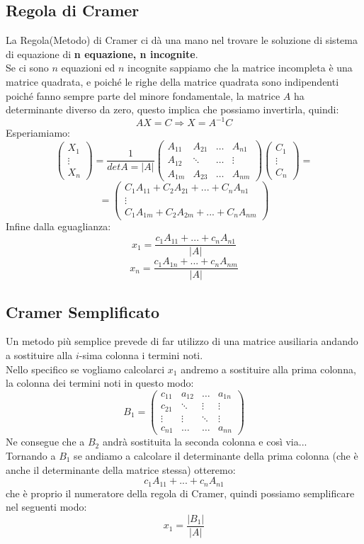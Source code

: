 \subsection{Regola di Cramer}
La Regola(Metodo) di Cramer ci dà una mano nel trovare le soluzione di sistema di equazione di \textbf{n equazione, n incognite}.\\
Se ci sono $n$ equazioni ed $n$ incognite sappiamo che la matrice
incompleta è una matrice quadrata, e poiché le righe della matrice quadrata sono indipendenti poiché fanno sempre parte del minore fondamentale, la matrice $A$ ha determinante diverso da zero, questo implica che possiamo invertirla, quindi:
$$ AX=C \Rightarrow X=A^{-1}C $$
Esperiamiamo:
$$ 
\begin{pmatrix}
X_1 \\ \vdots \\ X_n
\end{pmatrix}
= 
\frac{1}{detA = |A|}
\begin{pmatrix}
A_{11} & A_{21} & \dots & A_{n1} \\
A_{12} & \ddots & \dots & \vdots \\
A_{1m} & A_{23} & \dots & A_{nm}
\end{pmatrix}
\begin{pmatrix}
C_1 \\ \vdots \\ C_n
\end{pmatrix}
=
$$
$$ 
=
\begin{pmatrix}
C_1A_{11}+C_2A_{21}+...+C_nA_{n1} \\
\vdots \\
C_1A_{1m}+C_2A_{2m}+...+C_nA_{nm} 
\end{pmatrix}
$$
Infine dalla eguaglianza:
$$ x_1 = \frac{c_1A_{11}+...+c_nA_{n1}}{|A|} $$
$$ x_n = \frac{c_1A_{1n}+...+c_nA_{nm}}{|A|} $$

\subsection{Cramer Semplificato}
Un metodo più semplice prevede di far utilizzo di una matrice ausiliaria andando a sostituire alla $i$-sima colonna i termini noti.\\
Nello specifico se vogliamo calcolarci $x_1$ andremo a sostituire alla prima colonna, la colonna dei termini noti in questo modo:
$$
B_1 = 
\begin{pmatrix}
c_{11} & a_{12} & \dots & a_{1n} \\
c_{21} & \ddots & \vdots & \vdots \\
\vdots & \vdots & \ddots & \vdots \\
c_{n1} & \dots & \dots & a_{nn}
\end{pmatrix}
$$
Ne consegue che a $B_2$ andrà sostituita la seconda colonna e così via...\\
Tornando a $B_1$ se andiamo a calcolare il determinante della prima colonna (che è anche il determinante della matrice stessa) otteremo:
$$ c_1A_{11}+...+c_nA_{n1} $$
che è proprio il numeratore della regola di Cramer, quindi possiamo semplificare nel seguenti modo:
$$ x_1 = \frac{|B_1|}{|A|} $$

